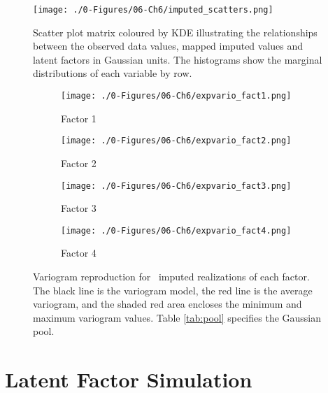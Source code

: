 \begin{figure}[htb!]
    \centering
    \texttt{[image: ./0-Figures/06-Ch6/imputed\_scatters.png]}
    \caption{Scatter plot matrix coloured by \gls{KDE} illustrating the relationships between the observed data values, mapped imputed values and latent factors in Gaussian units. The histograms show the marginal distributions of each variable by row. }
    \label{fig:imputed_scatters}
\end{figure}

\begin{figure}
    \begin{subfigure}{1.0\textwidth}
        \centering
        \texttt{[image: ./0-Figures/06-Ch6/expvario\_fact1.png]}
        \caption{Factor 1}
    \end{subfigure}
    \begin{subfigure}{1.0\textwidth}
        \centering
        \texttt{[image: ./0-Figures/06-Ch6/expvario\_fact2.png]}
        \caption{Factor 2}
    \end{subfigure}
    \begin{subfigure}{1.0\textwidth}
        \centering
        \texttt{[image: ./0-Figures/06-Ch6/expvario\_fact3.png]}
        \caption{Factor 3}
    \end{subfigure}
    \begin{subfigure}{1.0\textwidth}
        \centering
        \texttt{[image: ./0-Figures/06-Ch6/expvario\_fact4.png]}
        \caption{Factor 4}
    \end{subfigure}
    \caption{Variogram reproduction for \csnreals \ imputed realizations of each factor. The black line is the variogram model, the red line is the average variogram, and the shaded red area encloses the minimum and maximum variogram values. Table \ref{tab:pool} specifies the Gaussian pool.}
    \label{fig:nmrimp_repro_gvario}
\end{figure}


\FloatBarrier
\section{Latent Factor Simulation}
\label{sec:06fact_sim}

